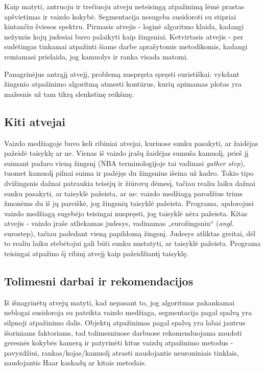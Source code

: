 \documentclass{VUMIFPSkursinis}
\begin{document}
Kaip matyti, antruoju ir trečiuoju atveju neteisingą atpažinimą lėmė prastas apšvietimas ir vaizdo kokybė. Segmentacija nesugeba susidoroti su stipriai kintančiu šviesos spektru. Pirmasis atvejis - loginė algoritmo klaida, kadangi nežymūs kojų judesiai buvo palaikyti kaip žingsniai. Ketvirtasis atvejis - per sudėtingas tinkamai atpažinti šiame darbe aprašytomis metodikomis, kadangi remiamasi prielaida, jog kamuolys ir ranka visada matomi.

Panagrinėjus antrąjį atvejį, problemą nuspręsta spręsti euristiškai: vykdant žingsnio atpažinimo algoritmą atmesti kontūrus, kurių apimamas plotas yra mažesnis už tam tikrą slenkstinę reikšmę. 

\subsection{Kiti atvejai}
 Vaizdo medžiagoje buvo keli ribiniai atvejai, kuriuose sunku pasakyti, ar žaidėjas pažeidė taisyklę ar ne. Vienas iš vaizdo įrašų žaidėjas sumuša kamuolį, prieš jį suimant padaro vieną žingsnį (NBA terminologijoje tai vadinasi \textit{gather step}), tuomet kamuolį pilnai suima ir padėjęs du žingsnius išeina už kadro. Tokio tipo dvižingsnis dažnai patraukia teisėjų ir žiūrovų dėmesį, tačiau realiu laiku dažnai sunku pasakyti, ar taisyklė pažeista, ar ne: vaizdo medžiagą parodžius trims žmonėms du iš jų pareiškė, jog žingsnių taisyklė pažeista. Programa, apdorojusi vaizdo medžiagą sugebėjo teisingai nuspręsti, jog taisyklė nėra pažeista. Kitas atvejis - vaizdo įraše atliekamas judesys, vadinamas „eurožingsniu“ (\textit{angl.} eurostep), tačiau padedant vieną papildomą žingsnį. Judesys atliktas greitai, dėl to realiu laiku stebėtojui gali būti sunku nustatyti, ar taisyklė pažeista. Programa teisingai atpažino šį ribinį atvejį kaip pažeidžiantį taisyklę. 

\subsection{Tolimesni darbai ir rekomendacijos} \label{Further work}
Iš išnagrinėtų atvejų matyti, kad nepasant to, jog algoritmas pakankamai neblogai susidoroja su pateikta vaizdo medžiaga, segmentacija pagal spalvą yra silpnoji atpažinimo dalis. Objektų atpažinimas pagal spalvą yra labai jautrus išoriniams faktoriams, tad tolimesniuose darbuose rekomenduojama naudoti geresnės kokybės kamerą ir patyrinėti kitus vaizdų atpažinimo metodus - pavyzdžiui, rankas/kojas/kamuolį atrasti naudojantis neuroniniais tinklais, naudojantis Haar kaskadų ar kitais metodais.
 
\end{document}
